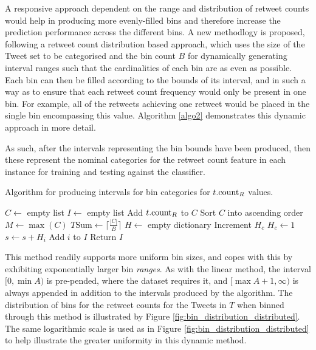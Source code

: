 A responsive approach dependent on the range and distribution of retweet counts would help in producing more evenly-filled bins and therefore increase the prediction performance across the different bins. A new methodlogy is proposed, following a retweet count distribution based approach, which uses the size of the Tweet set to be categorised and the bin count $B$ for dynamically generating interval ranges such that the cardinalities of each bin are as even as possible. Each bin can then be filled according to the bounds of its interval, and in such a way as to ensure that each retweet count frequency would only be present in one bin. For example, all of the retweets achieving one retweet would be placed in the single bin encompassing this value. Algorithm \ref{algo2} demonstrates this dynamic approach in more detail.

As such, after the intervals representing the bin bounds have been produced, then these represent the nominal categories for the retweet count feature in each instance for training and testing against the classifier.

\begin{algorithm}
\caption{Algorithm for producing intervals for bin categories for $t.\textrm{count}_R$ values.}
\begin{algorithmic}[1]
    \State $C\gets$ empty list 
    \State $I\gets$ empty list 
        \State Add $t.\textrm{count}_R$ to $C$
    \EndFor
    \State Sort $C$ into ascending order 
    \State $M\gets\max(C)$ 
    \State $T\textrm{Sum}\gets\lceil\frac{|C|}{B}\rceil$ 
    \State $H\gets$ empty dictionary 
    \Statex
            \State Increment $H_c$
        \Else
            \State $H_c\gets1$
        \EndIf
    \EndFor
            \State $s\gets s + H_i$
        \EndIf
            \State Add $i$ to $I$
        \EndIf
    \EndFor
    \State Return $I$
\EndProcedure
\end{algorithmic}
\label{algo2}
\end{algorithm}
 
This method readily supports more uniform bin sizes, and copes with this by exhibiting exponentially larger bin \textit{ranges}. As with the linear method, the interval $[0,\min{A})$ is pre-pended, where the dataset requires it, and $[\max{A}+1,\infty)$ is always appended in addition to the intervals produced by the algorithm. The distribution of bins for the retweet counts for the Tweets in $T$ when binned through this method is illustrated by Figure \ref{fig:bin_distribution_distributed}. The same logarithmic scale is used as in Figure \ref{fig:bin_distribution_distributed} to help illustrate the greater uniformity in this dynamic method.

